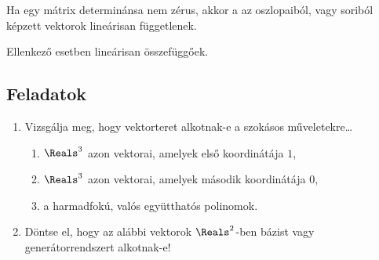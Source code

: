 \documentclass[a4paper, 12pt]{scrartcl}
\begin{document}
\begin{note}
  Ha egy mátrix determinánsa nem zérus, akkor a az oszlopaiból, vagy soriból
  képzett vektorok lineárisan függetlenek.

  Ellenkező esetben lineárisan összefüggőek.
\end{note}

\clearpage
\subsection{Feladatok}

\begin{enumerate}
  \item Vizsgálja meg, hogy vektorteret alkotnak-e a szokásos műveletekre\dots
        \begin{enumerate}
          \item $\Reals^3$ azon vektorai, amelyek első koordinátája $1$,
          \item $\Reals^3$ azon vektorai, amelyek második koordinátája $0$,
          \item a harmadfokú, valós együtthatós polinomok.
        \end{enumerate}

  \item Döntse el, hogy az alábbi vektorok $\Reals^2$-ben bázist vagy
        generátorrendszert alkotnak-e!
        \begin{center}
\end{center}
\end{enumerate}
\end{document}
